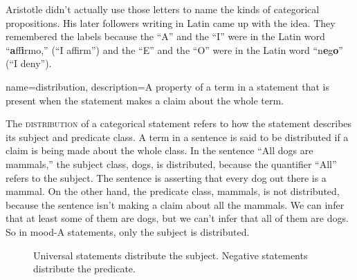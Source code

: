 Aristotle didn't actually use those letters to name the kinds of categorical propositions. His later followers writing in Latin came up with the idea. They remembered the labels because the ``A'' and the ``I'' were in the Latin word ``\textbf{a}ff\textbf{i}rmo,'' (``I affirm'') and the ``E'' and the ``O'' were in the Latin word ``n\textbf{e}g\textbf{o}'' (``I deny''). 


{
name=distribution,
description={A property of a term in a statement that is present when the statement makes a claim about the whole term.}
}

The \textsc{\gls{distribution}} of a categorical statement refers to how the statement describes its subject and predicate class. A term in a sentence is said to be distributed \label{def:Distribution} if a claim is being made about the whole class. In the sentence ``All dogs are mammals,'' the subject class, dogs, is distributed, because the quantifier ``All'' refers to the subject. The sentence is asserting that every dog out there is a mammal. On the other hand, the predicate class, mammals, is not distributed, because the sentence isn't making a claim about all the mammals. We can infer that at least some of them are dogs, but we can't infer that all of them are dogs. So in mood-A statements, only the subject is distributed. 

\begin{figure}[t]
\begin{mdframed}[style=mytableclearbox]
\begin{center} %
\end{center} %
\end{mdframed}
\caption{Universal statements distribute the subject. Negative statements distribute the predicate.}
\label{fig:distribution}
\end{figure}


